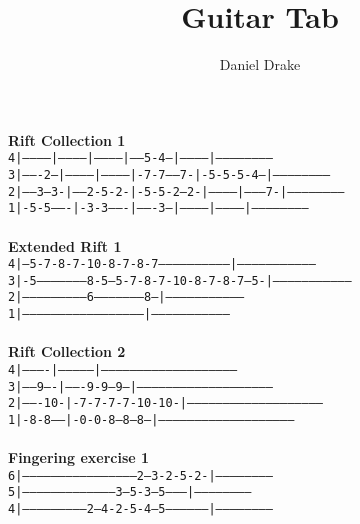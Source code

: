 \documentclass[12pt]{extarticle}
\title{Guitar Tab}
\author{Daniel Drake}
\def\code#1{\texttt{#1}}
\begin{document}
\maketitle
\noindent
\textbf{Rift Collection 1} \\
\code{4|-----------|-----------|-----------|-----5-4---|-----------|------------------------}\\
\code{3|-------2---|-----------|-----------|-7-7-----7-|-5-5-5-4---|------------------------}\\
\code{2|-----3---3-|-----2-5-2-|-5-5-2---2-|-----------|---------7-|------------------------}\\
\code{1|-5-5-------|-3-3-------|-------3---|-----------|-----------|------------------------}\\\\
\textbf{Extended Rift 1} \\
\code{4|---5-7-8-7-10-8-7-8-7------------------------------|---------------------------------}\\
\code{3|-5--------------------8-5---5-7-8-7-10-8-7-8-7---5-|---------------------------------}\\
\code{2|--------------------------6--------------------8---|--------------------------------}\\
\code{1|---------------------------------------------------|--------------------------------}\\\\
\textbf{Rift Collection 2} \\
\code{4|----------|---------------|---------------------------------------------------------}\\
\code{3|-----9----|-------9-9--9--|---------------------------------------------------------}\\
\code{2|-------10-|-7-7-7-7-10-10-|---------------------------------------------------------}\\
\code{1|-8-8------|-0-0-8---8--8--|---------------------------------------------------------}\\\\
\textbf{Fingering exercise 1}\\
\code{6|-----------------------------------------------2---3-2-5-2-|------------------------}\\
\code{5|---------------------------------------3---5-3---5---------|------------------------}\\
\code{4|---------------------------2---4-2-5-4---5-----------------|------------------------}\\
\end{document}
